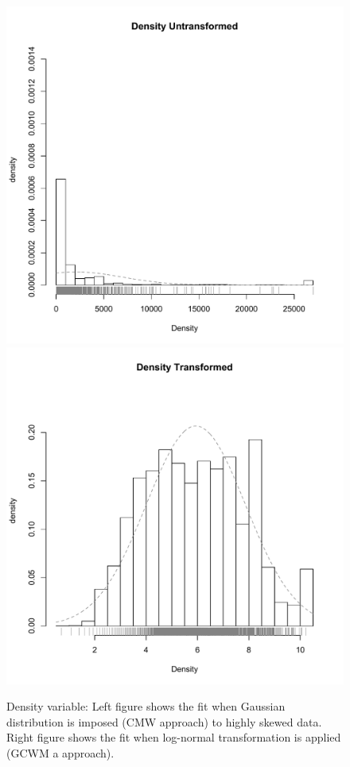 \documentclass[11pt,letterpaper]{article}
\numberwithin{equation}{section}
\numberwithin{equation}{section}
\numberwithin{equation}{section}
\begin{document}
\begin{figure}[!htb]
\begin{center}
\includegraphics[scale=0.40]{Density.pdf}
\includegraphics[scale=0.40]{logDensity.pdf}
\end{center}
\caption{Density variable: Left figure shows the fit when Gaussian distribution is imposed (CMW approach) to highly skewed data. Right figure shows the fit when log-normal transformation is applied (GCWM a approach).}
\label{fig:vet1}
\end{figure}
\end{document}

